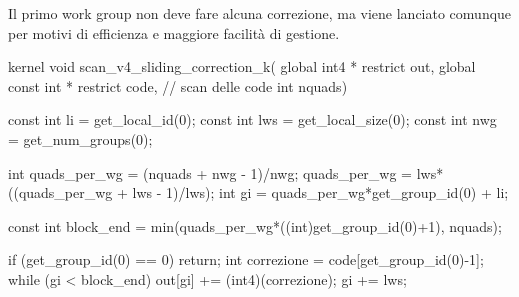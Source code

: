 Il primo work group non deve fare alcuna correzione, ma viene lanciato comunque per motivi di efficienza e maggiore facilità di gestione.
\begin{code}[caption={Kernel delle correzioni}, label={code:scan_correzioni}]
kernel void scan_v4_sliding_correction_k(
	global       int4 * restrict out,
	global const int  * restrict code, // scan delle code
	int nquads)
{
	const int li = get_local_id(0);
	const int lws = get_local_size(0);
	const int nwg = get_num_groups(0);

	int quads_per_wg = (nquads + nwg - 1)/nwg;
	quads_per_wg = lws*((quads_per_wg + lws - 1)/lws);
	int gi = quads_per_wg*get_group_id(0) + li;

	const int block_end = min(quads_per_wg*((int)get_group_id(0)+1), nquads);

	if (get_group_id(0) == 0) return;
	int correzione = code[get_group_id(0)-1];
	while (gi < block_end) {
		out[gi] += (int4)(correzione);
		gi += lws;
	}
}
\end{code}